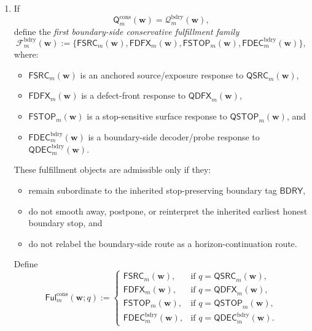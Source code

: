 \begin{definition}
\begin{enumerate}[label=(\roman*)]
 \[
 \mathsf{Ful}^{\mathrm{cons}}_{m}(\mathbf w;q)
 :=
 \begin{cases}
 \mathsf{FMSH}_{m}(\mathbf w), & \text{if }q=\mathsf{QMSH}_{m}(\mathbf w),\\[2mm]
 \mathsf{FCRS}_{m}(\mathbf w), & \text{if }q=\mathsf{QCRS}_{m}(\mathbf w),\\[2mm]
 \mathsf{FPDE}_{m}(\mathbf w), & \text{if }q=\mathsf{QPDE}_{m}(\mathbf w),\\[2mm]
 \mathsf{FDEC}^{\mathrm{hor}}_{m}(\mathbf w), & \text{if }q=\mathsf{QDEC}^{\mathrm{hor}}_{m}(\mathbf w).
 \end{cases}
 \]
 \item If
 \[
 \mathsf{Q}^{\mathrm{cons}}_{m}(\mathbf w)=\mathcal Q^{\mathrm{bdry}}_{m}(\mathbf w),
 \]
 define the \emph{first boundary-side conservative fulfillment family}
 \[
 \mathcal F^{\mathrm{bdry}}_{m}(\mathbf w)
 :=
 \{\mathsf{FSRC}_{m}(\mathbf w),\mathsf{FDFX}_{m}(\mathbf w),\mathsf{FSTOP}_{m}(\mathbf w),\mathsf{FDEC}^{\mathrm{bdry}}_{m}(\mathbf w)\},
 \]
 where:
 \begin{itemize}[leftmargin=2em]
 \item \(\mathsf{FSRC}_{m}(\mathbf w)\) is an anchored source/exposure response to \(\mathsf{QSRC}_{m}(\mathbf w)\),
 \item \(\mathsf{FDFX}_{m}(\mathbf w)\) is a defect-front response to \(\mathsf{QDFX}_{m}(\mathbf w)\),
 \item \(\mathsf{FSTOP}_{m}(\mathbf w)\) is a stop-sensitive surface response to \(\mathsf{QSTOP}_{m}(\mathbf w)\), and
 \item \(\mathsf{FDEC}^{\mathrm{bdry}}_{m}(\mathbf w)\) is a boundary-side decoder/probe response to \(\mathsf{QDEC}^{\mathrm{bdry}}_{m}(\mathbf w)\).
 \end{itemize}
 These fulfillment objects are admissible only if they:
 \begin{itemize}[leftmargin=2em]
 \item remain subordinate to the inherited stop-preserving boundary tag \(\mathsf{BDRY}\),
 \item do not smooth away, postpone, or reinterpret the inherited earliest honest boundary stop, and
 \item do not relabel the boundary-side route as a horizon-continuation route.
 \end{itemize}
 Define
 \[
 \mathsf{Ful}^{\mathrm{cons}}_{m}(\mathbf w;q)
 :=
 \begin{cases}
 \mathsf{FSRC}_{m}(\mathbf w), & \text{if }q=\mathsf{QSRC}_{m}(\mathbf w),\\[2mm]
 \mathsf{FDFX}_{m}(\mathbf w), & \text{if }q=\mathsf{QDFX}_{m}(\mathbf w),\\[2mm]
 \mathsf{FSTOP}_{m}(\mathbf w), & \text{if }q=\mathsf{QSTOP}_{m}(\mathbf w),\\[2mm]
 \mathsf{FDEC}^{\mathrm{bdry}}_{m}(\mathbf w), & \text{if }q=\mathsf{QDEC}^{\mathrm{bdry}}_{m}(\mathbf w).
 \end{cases}
 \]
\end{enumerate}
\end{definition}

